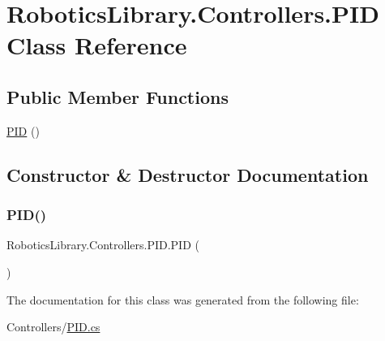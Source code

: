\hypertarget{class_robotics_library_1_1_controllers_1_1_p_i_d}{}\section{Robotics\+Library.\+Controllers.\+P\+ID Class Reference}
\label{class_robotics_library_1_1_controllers_1_1_p_i_d}
\subsection*{Public Member Functions}
\begin{DoxyCompactItemize}
\item 
\hyperlink{class_robotics_library_1_1_controllers_1_1_p_i_d_a14aece719f5fecdc6c63f566d4d335aa}{P\+ID} ()
\end{DoxyCompactItemize}


\subsection{Constructor \& Destructor Documentation}
\mbox{\label{class_robotics_library_1_1_controllers_1_1_p_i_d_a14aece719f5fecdc6c63f566d4d335aa}} 
\subsubsection{\texorpdfstring{P\+I\+D()}{PID()}}
{\footnotesize\ttfamily Robotics\+Library.\+Controllers.\+P\+I\+D.\+P\+ID (\begin{DoxyParamCaption}{ }\end{DoxyParamCaption})}



The documentation for this class was generated from the following file\+:\begin{DoxyCompactItemize}
\item 
Controllers/\hyperlink{_p_i_d_8cs}{P\+I\+D.\+cs}\end{DoxyCompactItemize}
